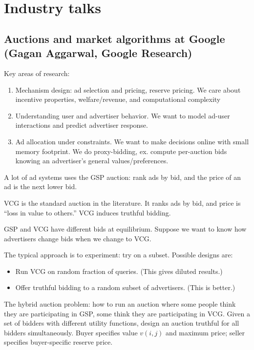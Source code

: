 \section{Industry talks}

\subsection{Auctions and market algorithms at Google (Gagan Aggarwal, Google Research)}

Key areas of research:
\begin{enumerate}
\item
Mechanism design: ad selection and pricing, reserve pricing. We care about incentive properties, welfare/revenue, and computational complexity
\item
Understanding user and advertiser behavior. We want to model ad-user interactions and predict advertiser response.
\item
Ad allocation under constraints. We want to make decisions online with small memory footprint. We do proxy-bidding, ex. compute per-auction bids knowing an advertiser's general values/preferences.
\end{enumerate}

A lot of ad systems uses the GSP auction: rank ads by bid, and the price of an ad is the next lower bid.

VCG is the standard auction in the literature. It ranks ads by bid, and price is ``loss in value to others.'' VCG induces truthful bidding.

GSP and VCG have different bids at equilibrium. Suppose we want to know how advertisers change bids when we change to VCG.

The typical approach is to experiment: try on a subset.  Possible designs are:
\begin{itemize}
\item
Run VCG on random fraction of queries. (This gives diluted results.)
\item
Offer truthful bidding to a random subset of advertisers. (This is better.)
\end{itemize}

The hybrid auction problem: how to run an auction where some people think they are participating in GSP, some think they are participating in VCG. Given a set of bidders with different utility functions, design an auction truthful for all bidders simultaneously.  Buyer specifies value $v(i,j)$ and maximum price; seller specifies buyer-specific reserve price.

